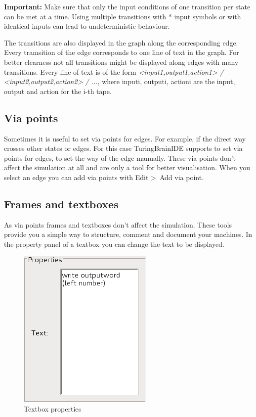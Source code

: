 \documentclass[%
  a4paper,%
  11pt,%
  blue,%
  hyperref	%
  ]{tubsartcl}
\begin{document}
\textbf{Important:} Make sure that only the input conditions of one transition per state can be met at a time. Using multiple transitions with * input symbols or with identical inputs can lead to undeterministic behaviour.

The transitions are also displayed in the graph along the corresponding edge. Every tramsition of the edge corresponds to one line of text in the graph. For better clearness not all transitions might be displayed along edges with many transitions. Every line of text is of the form \emph{<input1,output1,action1> / <input2,output2,action2> / ...}, where inputi, outputi, actioni are the input, output and action for the i-th tape.

\clearpage

\subsection{Via points}
\label{sec:via-points}
Sometimes it is useful to set via points for edges. For example, if the direct way crosses other states or edges. For this case TuringBrainIDE supports to set via points for edges, to set the way of the edge manually. These via points don't affect the simulation at all and are only a tool for better visualisation. When you select an edge you can add via points with Edit \textgreater \ Add via point.

\subsection{Frames and textboxes}
\label{sec:frames-textboxes}
As via points frames and textboxes don't affect the simulation. These tools provide you a simple way to structure, comment and document your machines. In the property panel of a textbox you can change the text to be displayed.
\begin{figure}[!htb]
\begin{center}
\includegraphics[scale=0.5]{graphics_gui/text_properties.png}
\end{center}
\caption{Textbox properties}
\label{pic:text_properties}
\end{figure}
\end{document}
